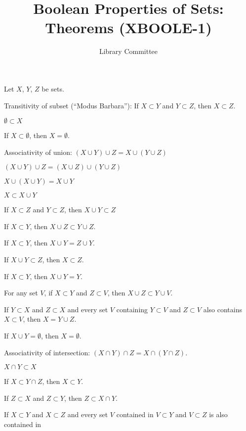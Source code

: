 \documentclass{article}
\title{Boolean Properties of Sets: Theorems (XBOOLE-1)}
\author{Library Committee}
\begin{document}
\maketitle
Let $X$, $Y$, $Z$ be sets.
\begin{thm}
\item\label{xboole1:1} Transitivity of subset (``Modus Barbara''): If $X\subset Y$ and $Y\subset Z$, then $X\subset Z$.
\item\label{xboole1:2} $\emptyset\subset X$
\item\label{xboole1:3} If $X\subset\emptyset$, then $X=\emptyset$.
\item\label{xboole1:4} Associativity of union: $(X\cup Y)\cup Z=X\cup(Y\cup Z)$
\item\label{xboole1:5} $(X\cup Y)\cup Z=(X\cup Z)\cup(Y\cup Z)$
\item\label{xboole1:6} $X\cup(X\cup Y)=X\cup Y$
\item\label{xboole1:7} $X\subset X\cup Y$
\item\label{xboole1:8} If $X\subset Z$ and $Y\subset Z$, then $X\cup Y\subset Z$
\item\label{xboole1:9} If $X\subset Y$, then $X\cup Z\subset Y\cup Z$.
\item\label{xboole1:10} If $X\subset Y$, then $X\cup Y=Z\cup Y$.
\item\label{xboole1:11} If $X\cup Y\subset Z$, then $X\subset Z$.
\item\label{xboole1:12} If $X\subset Y$, then $X\cup Y=Y$.
\item\label{xboole1:13} For any set $V$, if $X\subset Y$ and $Z\subset V$,
  then $X\cup Z\subset Y\cup V$.
\item\label{xboole1:14} If $Y\subset X$ and $Z\subset X$ and every set $V$ containing
  $Y\subset V$ and $Z\subset V$ also contains $X\subset V$,
  then $X=Y\cup Z$.
\item\label{xboole1:15} If $X\cup Y=\emptyset$, then $X=\emptyset$.
\item\label{xboole1:16} Associativity of intersection: $(X\cap Y)\cap Z=X\cap(Y\cap Z)$.
\item\label{xboole1:17} $X\cap Y\subset X$
\item\label{xboole1:18} If $X\subset Y\cap Z$, then $X\subset Y$.
\item\label{xboole1:19} If $Z\subset X$ and $Z\subset Y$, then $Z\subset X\cap Y$.
\item\label{xboole1:20} If $X\subset Y$ and $X\subset Z$ and every set
  $V$ contained in $V\subset Y$ and $V\subset Z$ is also contained in

\end{thm}
\end{document}
